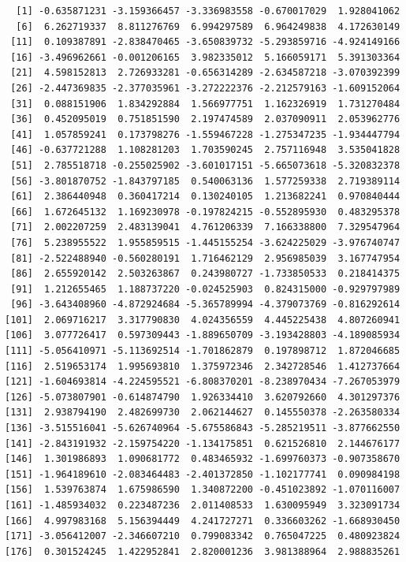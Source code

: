 \documentclass[
  letterpaper,
  DIV=11,
  numbers=noendperiod]{scrreprt}
\begin{document}
\begin{verbatim}
  [1] -0.635871231 -3.159366457 -3.336983558 -0.670017029  1.928041062
  [6]  6.262719337  8.811276769  6.994297589  6.964249838  4.172630149
 [11]  0.109387891 -2.838470465 -3.650839732 -5.293859716 -4.924149166
 [16] -3.496962661 -0.001206165  3.982335012  5.166059171  5.391303364
 [21]  4.598152813  2.726933281 -0.656314289 -2.634587218 -3.070392399
 [26] -2.447369835 -2.377035961 -3.272222376 -2.212579163 -1.609152064
 [31]  0.088151906  1.834292884  1.566977751  1.162326919  1.731270484
 [36]  0.452095019  0.751851590  2.197474589  2.037090911  2.053962776
 [41]  1.057859241  0.173798276 -1.559467228 -1.275347235 -1.934447794
 [46] -0.637721288  1.108281203  1.703590245  2.757116948  3.535041828
 [51]  2.785518718 -0.255025902 -3.601017151 -5.665073618 -5.320832378
 [56] -3.801870752 -1.843797185  0.540063136  1.577259338  2.719389114
 [61]  2.386440948  0.360417214  0.130240105  1.213682241  0.970840444
 [66]  1.672645132  1.169230978 -0.197824215 -0.552895930  0.483295378
 [71]  2.002207259  2.483139041  4.761206339  7.166338800  7.329547964
 [76]  5.238955522  1.955859515 -1.445155254 -3.624225029 -3.976740747
 [81] -2.522488940 -0.560280191  1.716462129  2.956985039  3.167747954
 [86]  2.655920142  2.503263867  0.243980727 -1.733850533  0.218414375
 [91]  1.212655465  1.188737220 -0.024525903  0.824315000 -0.929797989
 [96] -3.643408960 -4.872924684 -5.365789994 -4.379073769 -0.816292614
[101]  2.069716217  3.317790830  4.024356559  4.445225438  4.807260941
[106]  3.077726417  0.597309443 -1.889650709 -3.193428803 -4.189085934
[111] -5.056410971 -5.113692514 -1.701862879  0.197898712  1.872046685
[116]  2.519653174  1.995693810  1.375972346  2.342728546  1.412737664
[121] -1.604693814 -4.224595521 -6.808370201 -8.238970434 -7.267053979
[126] -5.073807901 -0.614874790  1.926334410  3.620792660  4.301297376
[131]  2.938794190  2.482699730  2.062144627  0.145550378 -2.263580334
[136] -3.515516041 -5.626740964 -5.675586843 -5.285219511 -3.877662550
[141] -2.843191932 -2.159754220 -1.134175851  0.621526810  2.144676177
[146]  1.301986893  1.090681772  0.483465932 -1.699760373 -0.907358670
[151] -1.964189610 -2.083464483 -2.401372850 -1.102177741  0.090984198
[156]  1.539763874  1.675986590  1.340872200 -0.451023892 -1.070116007
[161] -1.485934032  0.223487236  2.011408533  1.630095949  3.323091734
[166]  4.997983168  5.156394449  4.241727271  0.336603262 -1.668930450
[171] -3.056412007 -2.346607210  0.799083342  0.765047225  0.480923824
[176]  0.301524245  1.422952841  2.820001236  3.981388964  2.988835261

\end{verbatim}
\end{document}
